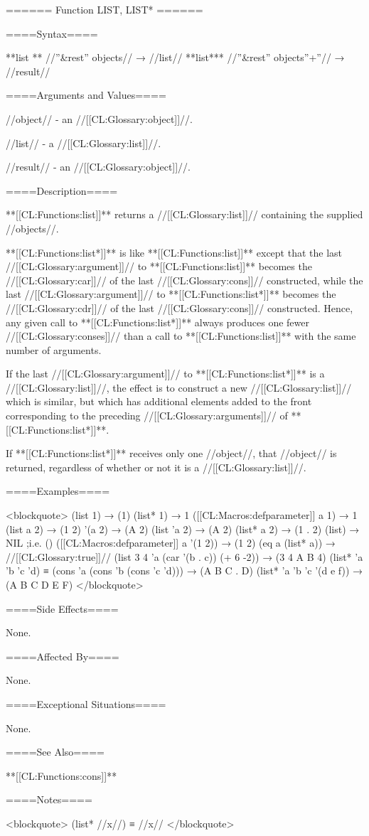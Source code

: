 ====== Function LIST, LIST* ======

====Syntax====

**{list} ** //''&rest'' objects// → //list// **{list*}** //''&rest'' objects''+''// → //result//

====Arguments and Values====

//object// - an //[[CL:Glossary:object]]//.

//list// - a //[[CL:Glossary:list]]//.

//result// - an //[[CL:Glossary:object]]//.

====Description====

**[[CL:Functions:list]]** returns a //[[CL:Glossary:list]]// containing the supplied //objects//.

**[[CL:Functions:list*]]** is like **[[CL:Functions:list]]** except that the last //[[CL:Glossary:argument]]// to **[[CL:Functions:list]]** becomes the //[[CL:Glossary:car]]// of the last //[[CL:Glossary:cons]]// constructed, while the last //[[CL:Glossary:argument]]// to **[[CL:Functions:list*]]** becomes the //[[CL:Glossary:cdr]]// of the last //[[CL:Glossary:cons]]// constructed. Hence, any given call to **[[CL:Functions:list*]]** always produces one fewer //[[CL:Glossary:conses]]// than a call to **[[CL:Functions:list]]** with the same number of arguments.

If the last //[[CL:Glossary:argument]]// to **[[CL:Functions:list*]]** is a //[[CL:Glossary:list]]//, the effect is to construct a new //[[CL:Glossary:list]]// which is similar, but which has additional elements added to the front corresponding to the preceding //[[CL:Glossary:arguments]]// of **[[CL:Functions:list*]]**.

If **[[CL:Functions:list*]]** receives only one //object//, that //object// is returned, regardless of whether or not it is a //[[CL:Glossary:list]]//.

====Examples====

<blockquote> (list 1) → (1) (list* 1) → 1 ([[CL:Macros:defparameter]] a 1) → 1 (list a 2) → (1 2) '(a 2) → (A 2) (list 'a 2) → (A 2) (list* a 2) → (1 . 2) (list) → NIL ;i.e. () ([[CL:Macros:defparameter]] a '(1 2)) → (1 2) (eq a (list* a)) → //[[CL:Glossary:true]]// (list 3 4 'a (car '(b . c)) (+ 6 -2)) → (3 4 A B 4) (list* 'a 'b 'c 'd) ≡ (cons 'a (cons 'b (cons 'c 'd))) → (A B C . D) (list* 'a 'b 'c '(d e f)) → (A B C D E F) </blockquote>

====Side Effects====

None.

====Affected By====

None.

====Exceptional Situations====

None.

====See Also====

**[[CL:Functions:cons]]**

====Notes====

<blockquote> (list* //x//) ≡ //x// </blockquote>

